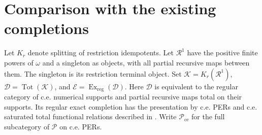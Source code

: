 \documentclass[11pt]{article}
\theoremstyle{definition}
\newcommand{\N}{\omega}
\newcommand{\Pcat}{\mathcal P}
\newcommand{\Rcat}{\mathcal R}
\newcommand{\Tot}{\operatorname{Tot}}
\begin{document}
\section{Comparison with the existing completions}\label{sec:completion}

Let $K_r$ denote splitting of restriction idempotents. Let
$\Rcat^1$ have the positive finite powers of $\N$ and a singleton
as objects, with all partial recursive maps between them. The
singleton is its restriction terminal object. Set
$\mathcal K=K_r(\Rcat^1)$,
$\mathcal D=\Tot(\mathcal K)$, and
$\mathcal E=\operatorname{Ex}_{\mathrm{reg}}(\mathcal D)$.
Here $\mathcal D$ is equivalent to the regular category of c.e.
numerical supports and partial recursive maps total on their supports.
Its regular exact completion has the presentation by c.e. PERs and
c.e. saturated total functional relations described in
\cite[section ``Completions of categories of partial operators'']{External}.
Write $\Pcat_{\mathrm{ce}}$ for the full subcategory of $\Pcat$
on c.e. PERs.
\end{document}
